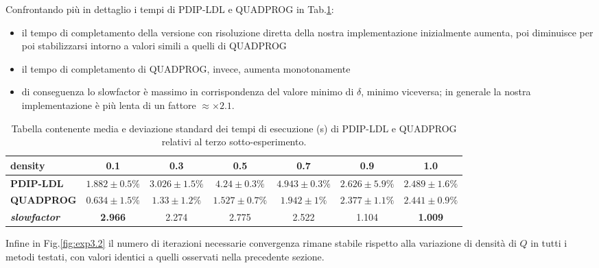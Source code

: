  Confrontando più in dettaglio i tempi di PDIP-LDL e QUADPROG in Tab.\ref{tab:ldlqp3}:
 \begin{itemize}
     \item il tempo di completamento della versione con risoluzione diretta della nostra implementazione inizialmente aumenta, poi diminuisce per poi stabilizzarsi intorno a valori simili a quelli di QUADPROG
     \item il tempo di completamento di QUADPROG, invece, aumenta monotonamente
     \item di conseguenza lo slowfactor è massimo in corrispondenza del valore minimo di $\delta$, minimo viceversa; in generale la nostra implementazione è più lenta di un fattore $\approx \times2.1$.
 \end{itemize}
\begin{table}[!h]
\centering
\begin{tabular}{l|c|c|c|c|c|c}
\textbf{density}                     & \textbf{0.1} & \textbf{0.3} & \textbf{0.5} & \textbf{0.7} & \textbf{0.9} & \textbf{1.0} \\ \hline
\textbf{PDIP-LDL}                    & $1.882 \pm 0.5\%$       & $3.026 \pm 1.5\%$       & $4.24  \pm 0.3\%$       & $4.943 \pm 0.3\%$       & $2.626 \pm 5.9\%$       & $2.489  \pm 1.6\%$       \\
\textbf{QUADPROG}                    & $0.634  \pm 1.5\%$      & $1.33  \pm 1.2\%$       & $1.527 \pm 0.7\%$       & $1.942 \pm 1\%$       & $2.377 \pm 1.1\%$       & $2.441 \pm 0.9\%$       \\
\textbf{\textit{slowfactor}} & \textbf{2.966}       & 2.274       & 2.775       & 2.522       & 1.104       & \textbf{1.009}
\end{tabular}
\caption{Tabella contenente media e deviazione standard dei tempi di esecuzione (s) di PDIP-LDL e QUADPROG relativi al terzo sotto-esperimento. \label{tab:ldlqp3}}
\end{table}

 Infine in Fig.\ref{fig:exp3.2} il numero di iterazioni necessarie convergenza rimane stabile rispetto alla variazione di densità di $Q$ in tutti i metodi testati, con valori identici a quelli osservati nella precedente sezione. 
 

